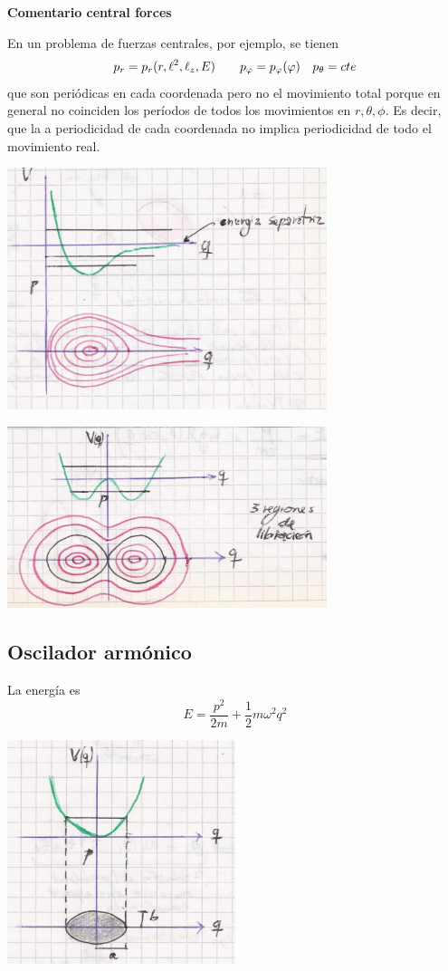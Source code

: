 \documentclass[10pt,oneside]{CBFT_book}
\begin{document}
\begin{ejemplo}{\bf Comentario central forces}

En un problema de fuerzas centrales, por ejemplo, se tienen
\[
	p_r = p_r(r,\ell^2,\ell_z,E) \qquad p_\varphi = p_\varphi(\varphi) \quad p_\theta =cte
\]
que son periódicas en cada coordenada pero no el movimiento total porque en general
no coinciden los períodos de todos los movimientos en $r,\theta,\phi$.
Es decir, que la a periodicidad de cada coordenada no implica periodicidad de todo el movimiento real.

\includegraphics[width=0.7\textwidth]{images/fig_mc_pendulo_angacc5.jpg}

\includegraphics[width=0.7\textwidth]{images/fig_mc_pendulo_angacc6.jpg}

\end{ejemplo}

\subsection{Oscilador armónico}

La energía es
\[
	E = \frac{p^2}{2m} + \frac{1}{2} m \omega^2 q^2
\]
 
\includegraphics[width=0.5\textwidth]{images/fig_mc_osciladorarm_angacc.jpg}
\end{document}
